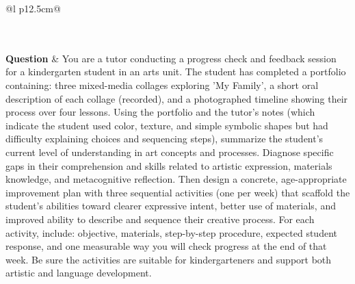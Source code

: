 \begin{longtable}{@{}l p{12.5cm}@{}}
  \caption{Skills per-instance answer comparison ($0 < \Delta < 25\%$) for the 15 most divergent items: same question, each model's answer and reasoning.}\label{tab:cmp_skills_pos0} \\
  \toprule
  \endfirsthead
  \toprule
  \endhead
   \\
  \textbf{Question} & You are a tutor conducting a progress check and feedback session for a kindergarten student in an arts unit. The student has completed a portfolio containing: three mixed-media collages exploring 'My Family', a short oral description of each collage (recorded), and a photographed timeline showing their process over four lessons. Using the portfolio and the tutor's notes (which indicate the student used color, texture, and simple symbolic shapes but had difficulty explaining choices and sequencing steps), summarize the student's current level of understanding in art concepts and processes. Diagnose specific gaps in their comprehension and skills related to artistic expression, materials knowledge, and metacognitive reflection. Then design a concrete, age-appropriate improvement plan with three sequential activities (one per week) that scaffold the student's abilities toward clearer expressive intent, better use of materials, and improved ability to describe and sequence their creative process. For each activity, include: objective, materials, step-by-step procedure, expected student response, and one measurable way you will check progress at the end of that week. Be sure the activities are suitable for kindergarteners and support both artistic and language development. \\

\end{longtable}
